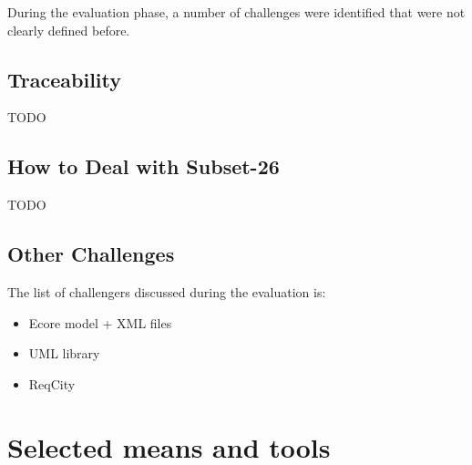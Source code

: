 During the evaluation phase, a number of challenges were identified that were not clearly defined before.

\subsection{Traceability}

TODO

\subsection{How to Deal with Subset-26}

TODO

\subsection{Other Challenges}

The list of challengers discussed during the evaluation is:

\begin{itemize}
\item Ecore model + XML  files
\item UML library
\item ReqCity
\end{itemize}

\section{Selected means and tools}

\begin{comment}
To complete after decision meeting with a section for each tool with the following contents:

\begin{itemize}
\item description of the means or tools, references and links
\item added value for openETCS
\item for which tasks and how (input/output/actions) is the mean or tools used.
\end{itemize}
\end{comment}